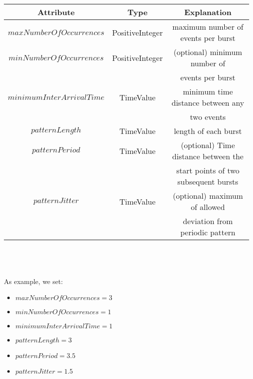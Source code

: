 \begin{tabular}{|c|c|c|}
	\hline
	\textbf{Attribute} & \textbf{Type} & \textbf{Explanation} \\
	\hline
	$maxNumberOfOccurrences$ & PositiveInteger & maximum number of events per burst\\
	\hline
	$minNumberOfOccurrences$ & PositiveInteger & (optional) minimum number of\\
	&				 & events per burst\\
	\hline
	$minimumInterArrivalTime$ & TimeValue & minimum time distance between any\\
	&			& two events\\
	\hline
	$patternLength$ & TimeValue &  length of each burst\\
	\hline
	$patternPeriod$ & TimeValue & (optional) Time distance between the\\
	&			  & start points of two subsequent bursts\\
	\hline
	$patternJitter$ & TimeValue & (optional) maximum of allowed\\
	&			  & deviation from periodic pattern\\
	\hline
\end{tabular}\\ \\ \\
As example, we set:
\begin{itemize}
	\item
	$maxNumberOfOccurrences = 3$
	\item
	$minNumberOfOccurrences = 1$
	\item
	$minimumInterArrivalTime = 1$
	\item
	$patternLength = 3$
	\item
	$patternPeriod = 3.5$
	\item
	$patternJitter = 1.5$
\end{itemize}

